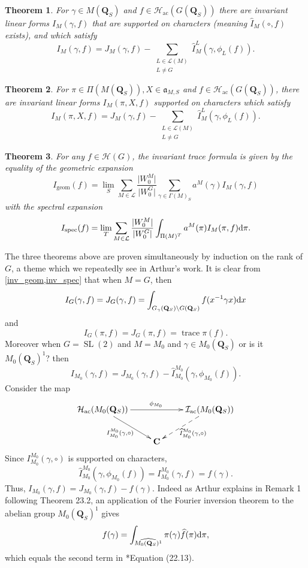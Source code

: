 \documentclass[11pt]{amsart}
\def\C{\mathbf C}
\def\Q{\mathbf Q}
\def\HHH{\mathcal H}
\def\III{\mathcal I}
\def\LLL{\mathcal L}
\def\aaa{\mathfrak a}
\def\cb#1{{\color{blue}#1}}
\def\d{\text d}
\def\bs{\setminus} 			%
\def\mod#1{\lvert #1 \rvert} %
\def\sl{\operatorname{SL}}
\def\trace{\operatorname{trace}}
\newtheorem{theorem}{Theorem}[section]
\theoremstyle{remark}
\begin{document}
\begin{theorem} \label{inv_geom}
For $\gamma \in M(\Q_S)$ and $f \in \HHH_{\text{ac}}(G(\Q_S))$ there are invariant linear forms $I_M(\gamma, f)$ that are supported on characters (meaning $\widehat I_M(\circ, f)$ exists), and which satisfy 
\[ I_M(\gamma, f) = J_M(\gamma, f) - \sum_{\substack{L \in \LLL(M) \\ L \neq G}} \widehat I_M^L(\gamma, \phi_L(f)). \]
\end{theorem}

\begin{theorem} \label{inv_spec}
For $\pi \in \Pi(M(\Q_S)), X \in \aaa_{M, S}$ and $f \in \HHH_{\text{ac}}(G(\Q_S))$, there are invariant linear forms $I_M(\pi, X, f)$ supported on characters which satisfy
\[ I_M(\pi, X, f) = J_M(\gamma, f) - \sum_{\substack{L \in \LLL(M) \\ L \neq G}} \widehat I_M^L(\gamma, \phi_L(f)). \]
\end{theorem}

\begin{theorem} \label{invtf}
For any $f \in \HHH(G)$, the invariant trace formula is given by the equality of the geometric expansion
\[ I_{\text{geom}}(f) = \lim_S \sum_{M \in \LLL} \frac{\mod{W_0^M}}{\mod{W_0^G}} \sum_{\gamma \in \Gamma(M)_S} a^M(\gamma) I_M(\gamma, f) \]
with the spectral expansion
\[ I_{\text{spec}}(f) = \lim_T \sum_{M \in \LLL} \frac{\mod{W_0^M}}{\mod{W_0^G}} \int_{\Pi(M)^T} a^M(\pi) I_M(\pi, f) \d \pi. \]
\end{theorem}

The three theorems above are proven simultaneously by induction on the rank of $G$, a theme which we repeatedly see in Arthur's work. It is clear from \cref{inv_geom,inv_spec} that when $M=G$, then
\[ I_G(\gamma, f) = J_G(\gamma, f) = \int_{G_\gamma(\Q_S)\bs G(\Q_S)} f(x^{-1}\gamma x) \d x \]
and 
\[ I_G(\pi, f) = J_G(\pi, f) = \trace \pi(f). \]
\cb{Moreover when $G = \sl(2)$ and $M = M_0$ and $\gamma \in M_0(\Q_S)$ {\color{red} or is it $M_0(\Q_S)^1$?} then 
\[ I_{M_0}(\gamma, f) = J_{M_0}(\gamma, f) - \widehat I_{M_0}^{M_0} (\gamma, \phi_{M_0}(f)). \]
Consider the map
\[ \xymatrix{\HHH_{\text{ac}}(M_0(\Q_S)) \ar[rr]^{\phi_{M_0}}  \ar[dr]_{I_{M_0}^{M_0}(\gamma, \circ)} && \III_{\text{ac}}(M_0(\Q_S)) \ar@{-->}[dl]^{\widehat I_{M_0}^{M_0} (\gamma, \circ)} \\ & \C & } \]
Since $I_{M_0}^{M_0}(\gamma, \circ)$ is supported on characters, 
\[ \widehat I_{M_0}^{M_0}(\gamma, \phi_{M_0}(f)) = I_{M_0}^{M_0}(\gamma, f) = f(\gamma). \]
Thus, $I_{M_0}(\gamma, f) = J_{M_0}(\gamma, f) - f(\gamma)$. Indeed as Arthur explains in Remark 1 following Theorem 23.2, an application of the Fourier inversion theorem to the abelian group $M_0(\Q_S)^1$ gives
\begin{equation} \label{f_gamma}
f(\gamma) = \int_{\widehat{M_0(\Q_S)^1}} \pi(\gamma) \widehat f(\pi) \d \pi, 
\end{equation}
which equals the second term in \cite{clay}*{Equation (22.13)}. 
}
\end{document}
